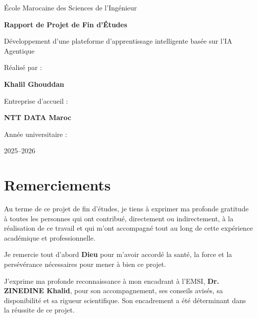 \documentclass[12pt,a4paper,oneside]{report}
\begin{document}

\begin{titlepage}

\centering

{\Large École Marocaine des Sciences de l'Ingénieur}

\vspace{2cm}

{\Huge\textbf{Rapport de Projet de Fin d'Études}}

\vspace{2cm}

{\LARGE Développement d'une plateforme d'apprentissage intelligente basée sur l'IA Agentique}

\vfill

Réalisé par :

\textbf{Khalil Ghouddan}

\vspace{1cm}

Entreprise d'accueil :

\textbf{NTT DATA Maroc}

\vspace{1cm}

Année universitaire :

2025--2026

\end{titlepage}





\chapter*{Remerciements}

Au terme de ce projet de fin d'études, je tiens à exprimer ma profonde gratitude à toutes les personnes qui ont contribué, directement ou indirectement, à la réalisation de ce travail et qui m'ont accompagné tout au long de cette expérience académique et professionnelle.

Je remercie tout d'abord \textbf{Dieu} pour m'avoir accordé la santé, la force et la persévérance nécessaires pour mener à bien ce projet.

J'exprime ma profonde reconnaissance à mon encadrant à l'EMSI, \textbf{Dr. ZINEDINE Khalid}, pour son accompagnement, ses conseils avisés, sa disponibilité et sa rigueur scientifique. Son encadrement a été déterminant dans la réussite de ce projet.
\end{document}
